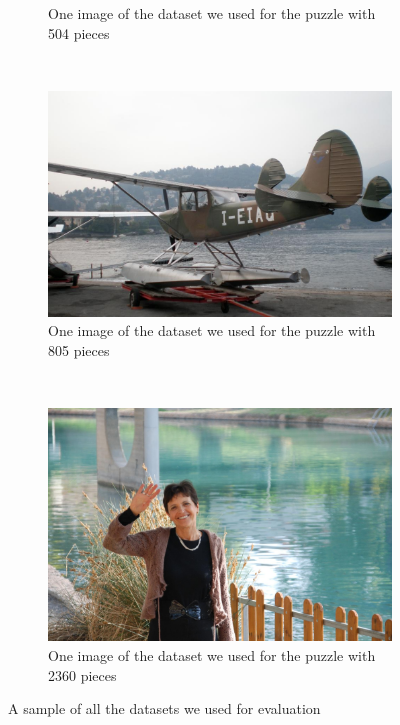 \documentclass[11pt]{report}
\begin{document}
\begin{figure}
\begin{subfigure}[b]{0.45\textwidth}
		\caption{One image of the dataset we used for the puzzle with 504 pieces}
		\label{img:540}
	\end{subfigure}
	~
	\begin{subfigure}[b]{0.45\textwidth}
		\includegraphics[width=\textwidth]{../imData/805/1.jpg}
		\caption{One image of the dataset we used for the puzzle with 805 pieces}
		\label{img:805}
	\end{subfigure}
	~
	\begin{subfigure}[b]{0.45\textwidth}
		\includegraphics[width=\textwidth]{../imData/2360/1.jpg}
		\caption{One image of the dataset we used for the puzzle with 2360 pieces}
		\label{img:2360}
	\end{subfigure}
	
	\caption{A sample of all the datasets we used for evaluation}
	\label{fig:database}
\end{figure}
\end{document}

